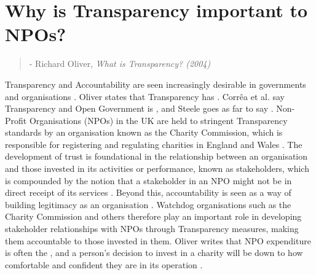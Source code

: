 \section{Why is Transparency important to NPOs?}

%
\begin{quote}
 - Richard Oliver, \textit{What is Transparency? (2004)}
\end{quote}


Transparency and Accountability are seen increasingly desirable in governments and organisations \cite{hood_accountability_2010, oliver_what_2004, heald_fiscal_2003}. Oliver states that Transparency has  \cite{oliver_what_2004}.  Corr\^ea et al. say Transparency and Open Government is  \cite{correa_really_2014}, and Steele goes as far to say  \cite{steele_open-source_2012}.
%
Non-Profit Organisations (NPOs) in the UK are held to stringent Transparency standards by an organisation known as the Charity Commission, which is responsible for registering and regulating charities in England and Wales  \cite{hm_government_charity_????}. The development of trust is foundational in the relationship between an organisation and those invested in its activities or performance, known as stakeholders, which is compounded by the notion that a stakeholder in an NPO might not be in direct receipt of its services \cite{macmillan_relationship_2005, krashinsky_stakeholder_1997}. Beyond this, accountability is seen as a way of building legitimacy as an organisation \cite{anheier_accountability_2009}. Watchdog organisations such as the Charity Commission and others therefore play an important role in developing stakeholder relationships with NPOs through Transparency measures, making them accountable to those invested in them. Oliver writes that NPO expenditure is often the , and a person's decision to invest in a charity will be down to how comfortable and confident they are in its operation \cite{oliver_what_2004}.


